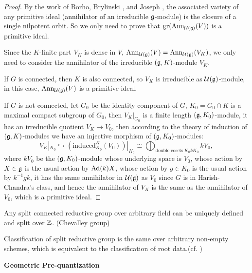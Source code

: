 \begin{proof}
  By the work of Borho, Brylinski \cite{BB82}, and Joseph \cite{Jos85}, the associated variety of any primitive ideal (annihilator of an irreducible $\mathfrak{g}$-module) is the closure of a single nilpotent orbit. So we only need to prove that $\operatorname{gr}(\operatorname{Ann}_{\mathcal{U}(\mathfrak{g})}(V))$ is a primitive ideal.

  Since the $K$-finite part $V_K$ is dense in $V$, $\operatorname{Ann}_{\mathcal{U}(\mathfrak{g})}(V) = \operatorname{Ann}_{\mathcal{U}(\mathfrak{g})}(V_K)$, we only need to consider the annihilator of the irreducible $(\mathfrak{g},K)$-module $V_K$.

  If $G$ is connected, then $K$ is also connected, so $V_K$ is irreducible as $\mathcal{U}(\mathfrak{g})$-module, in this case, $\operatorname{Ann}_{\mathcal{U}(\mathfrak{g})}(V)$ is a primitive ideal.

  If $G$ is not connected, let $G_0$ be the identity component of $G$, $K_0 = G_0 \cap K$ is a maximal compact subgroup of $G_0$, then $V_K|_{G_0}$ is a finite length $(\mathfrak{g},K_0)$-module, it has an irreducible quotient $V_K \to V_0$, then according to the theory of induction of $(\mathfrak{g},K)$-modules \cite[Chapter 2]{KV95} we have an injective morphism of $(\mathfrak{g},K_0)$-modules:
  \begin{equation}
     V_K|_{K_0} \hookrightarrow  (\mathrm{induced}_{K_0}^{K}(V_0))|_{K_0} \cong \bigoplus_{\textrm{double cosets} \ K_0 k K_0} kV_0,
  \end{equation}
  where $kV_0$ be the $(\mathfrak{g},K_0)$-module whose underlying space is $V_0$, whose action by $X \in \mathfrak{g}$ is the usual action by $\operatorname{Ad}(k)X$, whose action by $g \in K_0$ is the usual action by $k^{-1}gk$, it has the same annihilator in $\mathcal{U}(\mathfrak{g})$ as $V_0$ since $G$ is in Harish-Chandra's class, and hence the annihilator of $V_K$ is the same as the annihilator of $V_0$, which is a primitive ideal.

\end{proof}



Any split connected reductive group over arbitrary field can be uniquely defined and split over $\mathbb{Z}$. (Chevalley group)

Classification of split reductive group is the same over arbitrary non-empty schemes, which is equivalent to the classification of root data.(cf. \cite{SGA3})





\textbf{Geometric Pre-quantization}

